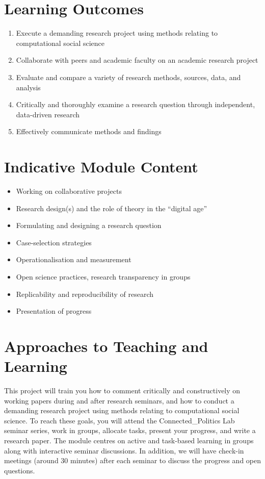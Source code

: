 \documentclass[abstract=on,parskip=full,headings=standardclasses,fontsize=11pt,paper=a4]{scrartcl}
\begin{document}
\section*{Learning Outcomes}

\begin{enumerate}
\item  Execute a demanding research project using methods relating to computational social science
\item  Collaborate with peers and academic faculty on an academic research project
\item Evaluate and compare a variety of research methods, sources, data, and analysis
\item Critically and thoroughly examine a research question through independent, data-driven research
\item Effectively communicate methods and findings
\end{enumerate}


\section*{Indicative Module Content}


\begin{itemize}
\item Working on collaborative projects
\item Research design(s) and the role of theory in the ``digital age''
\item Formulating and designing a research question
\item Case-selection strategies
\item Operationalisation and measurement
\item  Open science practices, research transparency in groups
\item Replicability and reproducibility of research
\item Presentation of progress
\end{itemize}


\section*{Approaches to Teaching and Learning}


This project will train you how to comment critically and constructively on working papers during and after  research seminars, and how to conduct a demanding research project using methods relating to computational social science. To reach these goals, you will  attend the Connected\_Politics Lab seminar series,  work in groups,  allocate tasks, present your progress, and write a research paper. The module centres on active and task-based learning in groups along with interactive seminar discussions. In addition, we will have check-in meetings (around 30 minutes) after each seminar to discuss the progress and open questions.
\end{document}
